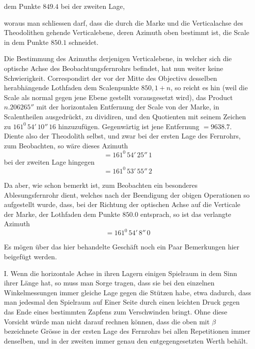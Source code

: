 \noindent\hspace*{\parindent}\par
dem Punkte $849.4$ bei der zweiten Lage,\par
\noindent woraus man schliessen darf, dass die durch die Marke und die Verticalachse des Theodolithen gehende Verticalebene, deren Azimuth oben bestimmt ist, die Scale in dem Punkte $850.1$ schneidet.

Die Bestimmung des Azimuths derjenigen Verticalebene, in welcher sich die optische Achse des Beobachtungsfernrohrs befindet, hat nun weiter keine Schwierigkeit. Correspondirt der vor der Mitte des Objectivs desselben herabhängende Lothfaden dem Scalenpunkte $850{,}1+n$, so reicht es hin (weil die Scale als normal gegen jene Ebene gestellt vorausgesetzt wird), das Product $n.206265''$ mit der horizontalen Entfernung der Scale von der Marke, in Scalentheilen ausgedrückt, zu dividiren, und den Quotienten mit seinem Zeichen zu $161^0\,54'\,10''\,16$ hinzuzufügen. Gegenwärtig ist jene Entfernung $=9638.7$. Diente also der Theodolith selbst, und zwar bei der ersten Lage des Fernrohrs, zum Beobachten, so wäre dieses Azimuth
\[
=161^0\,54'\,25''\,1
\]
bei der zweiten Lage hingegen
\[
=161^0\,53'\,55''\,2
\]
\par{}
\par\clearpage
{}
\noindent Da aber, wie schon bemerkt ist, zum Beobachten ein besonderes Ablesungsfernrohr dient, welches nach der Beendigung der obigen Operationen so aufgestellt wurde, dass, bei der Richtung der optischen Achse auf die Verticale der Marke, der Lothfaden dem Punkte $850.0$ entsprach, so ist das verlangte Azimuth
\[
=161^0\,54'\,8''\,0
\]

Es mögen über das hier behandelte Geschäft noch ein Paar Bemerkungen hier beigefügt werden.

I. Wenn die horizontale Achse in ihren Lagern einigen Spielraum in dem Sinn ihrer Länge hat, so muss man Sorge tragen, dass sie bei den einzelnen Winkelmessungen immer gleiche Lage gegen die Stützen habe, etwa dadurch, dass man jedesmal den Spielraum auf Einer Seite durch einen leichten Druck gegen das Ende eines bestimmten Zapfens zum Verschwinden bringt. Ohne diese Vorsicht würde man nicht darauf rechnen können, dass die oben mit $\beta$ bezeichnete Grösse in der ersten Lage des Fernrohrs bei allen Repetitionen immer denselben, und in der zweiten immer genau den entgegengesetzten Werth behält.

